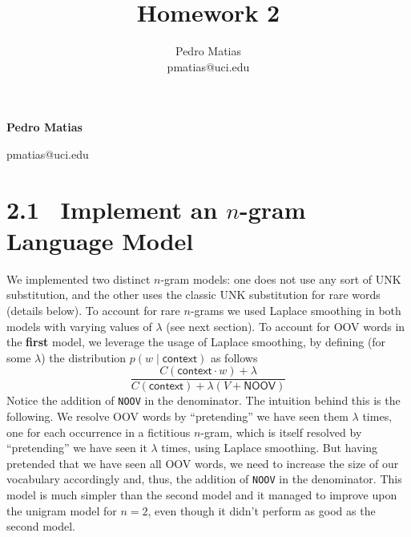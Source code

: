 \documentclass[11pt]{article}
\title{Homework 2}
\author{Pedro Matias \\
\textsf{pmatias@uci.edu}}
\begin{document}

\noindent\textbf{Pedro Matias}

\noindent\textsf{pmatias@uci.edu}


\setcounter{section}{2}

\section*{2.1$\;\;$ Implement an $n$-gram Language Model}

We implemented two distinct $n$-gram models: one does not use any sort of UNK substitution, and the other uses the classic UNK substitution for rare words (details below). To account for rare $n$-grams we used Laplace smoothing in both models with varying values of $\lambda$ (see next section). To account for OOV words in the \textbf{first} model, we leverage the usage of Laplace smoothing, by defining (for some $\lambda$) the distribution $p(w\mid \textsf{context})$ as follows
\[
\frac{C(\textsf{context}\cdot w) + \lambda}{C(\textsf{context}) + \lambda(V + \textsf{NOOV})}
\]
Notice the addition of \texttt{NOOV} in the denominator. The intuition behind this is the following. We resolve OOV words by ``pretending'' we have seen them $\lambda$ times, one for each occurrence in a fictitious $n$-gram, which is itself resolved by ``pretending'' we have seen it $\lambda$ times, using Laplace smoothing. But having pretended that we have seen all OOV words, we need to increase the size of our vocabulary accordingly and, thus, the addition of \texttt{NOOV} in the denominator. This model is much simpler than the second model and it managed to improve upon the unigram model for $n=2$, even though it didn't perform as good as the second model.
\end{document}

